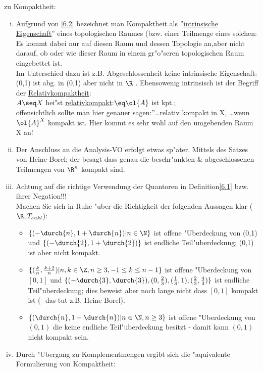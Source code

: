 \begin{bem}\label{6.3}zu Kompaktheit:
\begin{enumerate}[(i)]
\item Aufgrund von \ref{6.2} bezeichnet man Kompaktheit als ''\ul{intrinsische Eigenschaft}'' eines topologischen Raumes (bzw. einer Teilmenge eines solchen: Es kommt dabei nur auf diesen Raum und dessen Topologie an,aber {\sc nicht} darauf, ob oder wie dieser Raum in einem gr"o"seren topologischen Raum eingebettet ist.\\
Im Unterschied dazu ist z.B. Abgeschlossenheit keine intrinsische Eigenschaft: (0,1) ist abg. in (0,1) aber nicht in $\R$ . Ebensowenig intrinsisch ist der Begriff der \ul{Relativkompaktheit}:\\
$A\seq X$ hei"st \ul{relativkompakt}:$\eq \ol{A}$ ist kpt.;\\
offensichtlich sollte man hier genauer sagen:''\dots relativ kompakt in X, \dots wenn $\ol{A}^X$ kompakt ist. Hier kommt es sehr wohl auf den umgebenden Raum X an!
\item Der Anschluss an die Analysis-VO erfolgt etwas sp"ater. Mittels des Satzes von {\sc Heine-Borel}; der besagt dass genau die beschr"ankten \& abgeschlossenen Teilmengen von $\R^n$ kompakt sind.
\item Achtung auf die richtige Verwendung der Quantoren in Definition\ref{6.1} bzw. ihrer Negation!!!\\
Machen Sie sich in Ruhe "uber die Richtigkeit der folgenden Aussagen klar ($\R ,T_{eukl}$):
\begin{itemize}
\item $\{ (-\durch{n}, 1+\durch{n})|n\in\N\}$ ist offene "Uberdeckung von (0,1) und $\{ (-\durch{2},1+\durch{2})\}$ ist endliche Teil"uberdeckung; (0,1) ist aber nicht kompakt.
\item $\{ (\frac{k}{n},\frac{k+2}{n})|n,k\in\Z ,n\geq 3,-1\leq k\leq n-1\}$ ist offene "Uberdeckung von $[0,1]$ und $\{ (-\durch{3},\durch{3}), (0,\frac{2}{3}), (\frac{1}{3},1), (\frac{2}{3},\frac{4}{3})\}$ ist endliche Teil"uberdeckung; dies beweist aber noch lange nicht dass $[0,1]$ kompakt ist (- das tut z.B. Heine Borel).
\item $\{ (\durch{n},1-\durch{n})|n\in\N ,n\geq 3\}$ ist offene "Uberdeckung von $(0,1)$ die {\sc keine} endliche Teil"uberdeckung besitzt - damit kann $(0,1)$ nicht kompakt sein.
\end{itemize}
\item Durch "Ubergang zu Komplementmengen ergibt sich die "aquivalente Formulierung von Kompaktheit:\\

\end{enumerate}
\end{bem}
